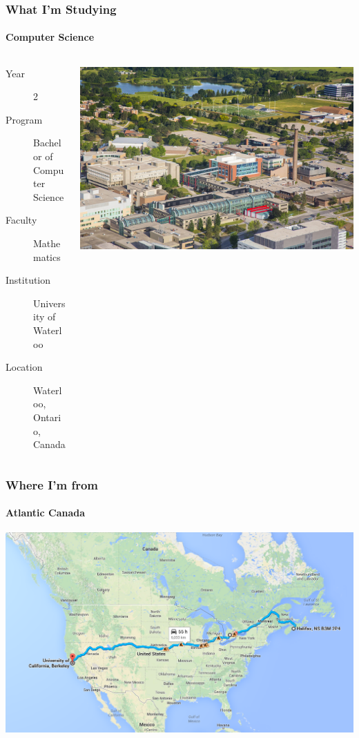 \documentclass[mathserif, aspectratio=169]{beamer}
\begin{document}
\begin{frame}

\frametitle{What I'm Studying}
\framesubtitle{Computer Science}

\begin{columns}
\begin{column}{.7\textwidth}
\begin{description}
\item[Year] 2
\item[Program] Bachelor of Computer Science
\item[Faculty] Mathematics
\item[Institution] University of Waterloo
\item[Location] Waterloo, Ontario, Canada
\end{description}
\end{column}
\begin{column}{.3\textwidth}
\includegraphics[width=1.0\linewidth]{images/campus}
\end{column}
\end{columns}

\end{frame}


\begin{frame}
\frametitle{Where I'm from}
\framesubtitle{Atlantic Canada}
\centering
\includegraphics[height=.75\textheight]{images/map}
\end{frame}
\end{document}
